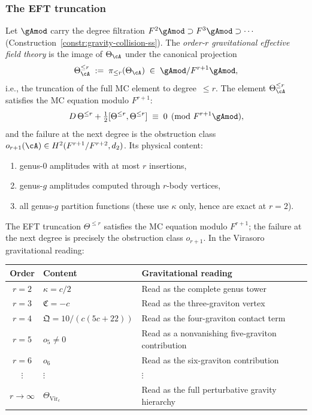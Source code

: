 \subsubsection*{The EFT truncation}

\begin{definition}
\label{def:gravity-eft}
Let $\gAmod$ carry the degree filtration
$F^2\gAmod \supset F^3\gAmod \supset \cdots$
\textup{(}Construction~\textup{\ref{constr:gravity-collision-ss}}\textup{)}.
The \emph{order-$r$ gravitational effective field theory} is the
image of $\Theta_\cA$ under the canonical projection
\[
\Theta_\cA^{\le r}
\;:=\;
\pi_{\le r}(\Theta_\cA)
\;\in\;
\gAmod / F^{r+1}\gAmod,
\]
i.e., the truncation of the full MC element to
degree~$\le r$. The element $\Theta_\cA^{\le r}$ satisfies the
MC equation modulo $F^{r+1}$:
\[
D\,\Theta^{\le r}
+ \tfrac{1}{2}[\Theta^{\le r}, \Theta^{\le r}]
\;\equiv\; 0 \pmod{F^{r+1}\gAmod},
\]
and the failure at the next degree is the obstruction class
$o_{r+1}(\cA) \in H^2(F^{r+1}/F^{r+2}, d_2)$.
Its physical content:
\begin{enumerate}[label=\textup{--}]
\item genus-$0$ amplitudes with at most $r$ insertions,
\item genus-$g$ amplitudes computed through $r$-body vertices,
\item all genus-$g$ partition functions (these use $\kappa$ only,
 hence are exact at $r = 2$).
\end{enumerate}
\end{definition}

The EFT truncation $\Theta^{\le r}$ satisfies the MC equation
modulo $F^{r+1}$; the failure at the next degree is precisely the
obstruction class $o_{r+1}$. In the Virasoro gravitational reading:
\begin{center}
\small
\renewcommand{\arraystretch}{1.15}
\begin{tabular}{cll}
\textbf{Order} & \textbf{Content} & \textbf{Gravitational reading} \\
\hline
$r = 2$ & $\kappa = c/2$ & Read as the complete genus tower \\
$r = 3$ & $\mathfrak{C} = -c$ & Read as the three-graviton vertex \\
$r = 4$ & $\mathfrak{Q} = 10/(c(5c+22))$
 & Read as the four-graviton contact term \\
$r = 5$ & $o_5 \ne 0$ & Read as a nonvanishing five-graviton contribution \\
$r = 6$ & $o_6$ & Read as the six-graviton contribution \\
$\vdots$ & $\vdots$ & $\vdots$ \\
$r \to \infty$ & $\Theta_{\mathrm{Vir}_c}$ & Read as the full perturbative gravity hierarchy
\end{tabular}
\end{center}

